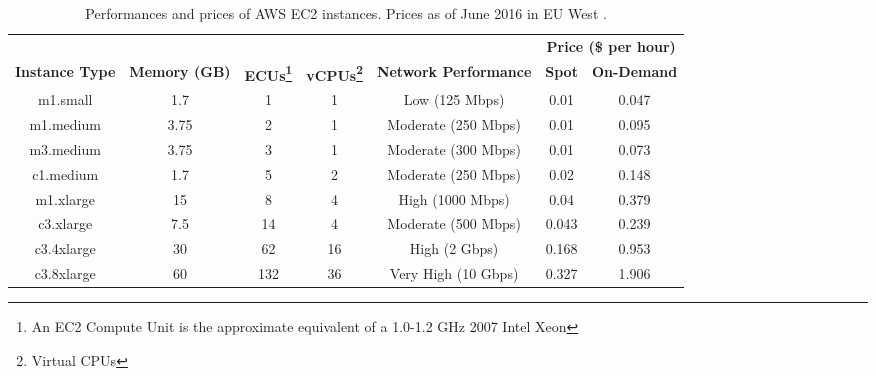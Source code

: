 \begin{table}[h]
\centering
\begin{adjustbox}{width=1\textwidth}
\begin{tabular}{ccccccc}
 &  &  &  &  & \multicolumn{2}{c}{\textbf{Price (\$ per hour)}} \\ \cline{6-7} 
\textbf{Instance Type} & \textbf{Memory (GB)} & \textbf{ECUs\footnote{An EC2 Compute Unit is the approximate equivalent of a 1.0-1.2 GHz 2007 Intel Xeon}} & \textbf{vCPUs\footnote{Virtual CPUs}} & \multicolumn{1}{c|}{\textbf{Network Performance}} & \multicolumn{1}{c|}{\textbf{Spot}} & \multicolumn{1}{c|}{\textbf{On-Demand}} \\ \hline
\multicolumn{1}{|c|}{m1.small} & \multicolumn{1}{c|}{1.7} & \multicolumn{1}{c|}{1} & \multicolumn{1}{c|}{1} & \multicolumn{1}{c|}{Low (125 Mbps)} & \multicolumn{1}{c|}{0.01} & \multicolumn{1}{c|}{0.047} \\ \hline
\multicolumn{1}{|c|}{m1.medium} & \multicolumn{1}{c|}{3.75} & \multicolumn{1}{c|}{2} & \multicolumn{1}{c|}{1} & \multicolumn{1}{c|}{Moderate (250 Mbps)} & \multicolumn{1}{c|}{0.01} & \multicolumn{1}{c|}{0.095} \\ \hline
\multicolumn{1}{|c|}{m3.medium} & \multicolumn{1}{c|}{3.75} & \multicolumn{1}{c|}{3} & \multicolumn{1}{c|}{1} & \multicolumn{1}{c|}{Moderate (300 Mbps)} & \multicolumn{1}{c|}{0.01} & \multicolumn{1}{c|}{0.073} \\ \hline
\multicolumn{1}{|c|}{c1.medium} & \multicolumn{1}{c|}{1.7} & \multicolumn{1}{c|}{5} & \multicolumn{1}{c|}{2} & \multicolumn{1}{c|}{Moderate (250 Mbps)} & \multicolumn{1}{c|}{0.02} & \multicolumn{1}{c|}{0.148} \\ \hline
\multicolumn{1}{|c|}{m1.xlarge} & \multicolumn{1}{c|}{15} & \multicolumn{1}{c|}{8} & \multicolumn{1}{c|}{4} & \multicolumn{1}{c|}{High (1000 Mbps)} & \multicolumn{1}{c|}{0.04} & \multicolumn{1}{c|}{0.379} \\ \hline
\multicolumn{1}{|c|}{c3.xlarge} & \multicolumn{1}{c|}{7.5} & \multicolumn{1}{c|}{14} & \multicolumn{1}{c|}{4} & \multicolumn{1}{c|}{Moderate (500 Mbps)} & \multicolumn{1}{c|}{0.043} & \multicolumn{1}{c|}{0.239} \\ \hline
\multicolumn{1}{|c|}{c3.4xlarge} & \multicolumn{1}{c|}{30} & \multicolumn{1}{c|}{62} & \multicolumn{1}{c|}{16} & \multicolumn{1}{c|}{High (2 Gbps)} & \multicolumn{1}{c|}{0.168} & \multicolumn{1}{c|}{0.953} \\ \hline
\multicolumn{1}{|c|}{c3.8xlarge} & \multicolumn{1}{c|}{60} & \multicolumn{1}{c|}{132} & \multicolumn{1}{c|}{36} & \multicolumn{1}{c|}{Very High (10 Gbps)} & \multicolumn{1}{c|}{0.327} & \multicolumn{1}{c|}{1.906} \\ \hline
\end{tabular}
\end{adjustbox}
\caption{Performances and prices of AWS EC2 instances. Prices as of June 2016 in EU West \cite{EC2}.}
\label{InstancePrices}
\end{table}


